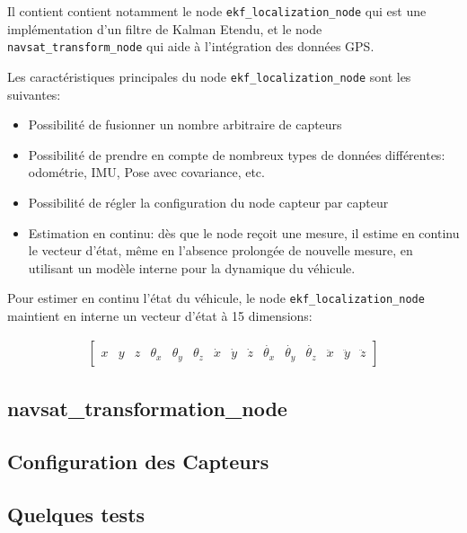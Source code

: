 \documentclass[12pt,a4paper]{report}
\begin{document}
	\para Il contient contient notamment le node \verb|ekf_localization_node| qui est une implémentation d'un filtre de Kalman Etendu, et le node \verb|navsat_transform_node| qui aide à l'intégration des données GPS.
	
	\para Les caractéristiques principales du node \verb|ekf_localization_node| sont les suivantes:
	\begin{itemize}
		\item Possibilité de fusionner un nombre arbitraire de capteurs
		\item Possibilité de prendre en compte de nombreux types de données différentes: odométrie, IMU, Pose avec covariance, etc.
		\item Possibilité de régler la configuration du node capteur par capteur
		\item Estimation en continu: dès que le node reçoit une mesure, il estime en continu le vecteur d'état, même en l'absence prolongée de nouvelle mesure, en utilisant un modèle interne pour la dynamique du véhicule.
	\end{itemize}

	\para Pour estimer en continu l'état du véhicule, le node \verb|ekf_localization_node| maintient en interne un vecteur d'état à 15 dimensions:
	
	\begin{gather}
		\begin{bmatrix}
			x&y&z&\theta_x&\theta_y&\theta_z&
			\dot{x}&\dot{y}&\dot{z}&\dot{\theta_x}&\dot{\theta_y}&\dot{\theta_z} &\ddot{x}&\ddot{y}&\ddot{z}
		\end{bmatrix}
	\end{gather}
	
	\subsection{navsat\_transformation\_node}
	
	\subsection{Configuration des Capteurs}
	
	\subsection{Quelques tests}
	
\end{document}

